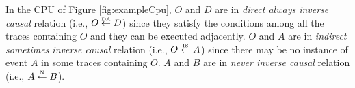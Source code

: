 \documentclass{llncs}
\begin{document}

\begin{example}
In the CPU of Figure \ref{fig:exampleCpu}, $O$ and $D$ are in \textit{direct always inverse causal} relation (i.e., $O\overset{\text{\tiny{DA}}}{\leftarrow}D$) since they satisfy the conditions among all the traces containing $O$ and they can be executed adjacently. $O$ and $A$ are in \textit{indirect sometimes inverse causal} relation (i.e., $O\overset{\text{\tiny{IS}}}{\leftarrow}A$) since there may be no instance of event $A$ in some traces containing $O$. $A$ and $B$ are in \textit{never inverse causal} relation (i.e., $A\overset{\text{\tiny{N}}}{\leftarrow} B$).
\end{example}
\end{document}
